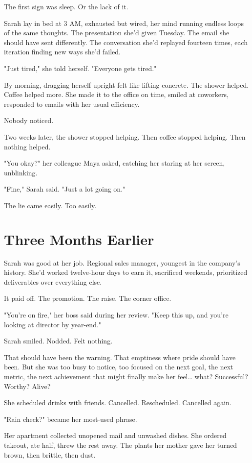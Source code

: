 \documentclass[11pt,twoside]{book}
\begin{document}
The first sign was sleep. Or the lack of it.

Sarah lay in bed at 3 AM, exhausted but wired, her mind running endless loops of the same thoughts. The presentation she'd given Tuesday. The email she should have sent differently. The conversation she'd replayed fourteen times, each iteration finding new ways she'd failed.

"Just tired," she told herself. "Everyone gets tired."

By morning, dragging herself upright felt like lifting concrete. The shower helped. Coffee helped more. She made it to the office on time, smiled at coworkers, responded to emails with her usual efficiency.

Nobody noticed.

Two weeks later, the shower stopped helping. Then coffee stopped helping. Then nothing helped.

"You okay?" her colleague Maya asked, catching her staring at her screen, unblinking.

"Fine," Sarah said. "Just a lot going on."

The lie came easily. Too easily.

\section*{Three Months Earlier}

Sarah was good at her job. Regional sales manager, youngest in the company's history. She'd worked twelve-hour days to earn it, sacrificed weekends, prioritized deliverables over everything else.

It paid off. The promotion. The raise. The corner office.

"You're on fire," her boss said during her review. "Keep this up, and you're looking at director by year-end."

Sarah smiled. Nodded. Felt nothing.

That should have been the warning. That emptiness where pride should have been. But she was too busy to notice, too focused on the next goal, the next metric, the next achievement that might finally make her feel\ldots{} what? Successful? Worthy? Alive?

She scheduled drinks with friends. Cancelled. Rescheduled. Cancelled again.

"Rain check?" became her most-used phrase.

Her apartment collected unopened mail and unwashed dishes. She ordered takeout, ate half, threw the rest away. The plants her mother gave her turned brown, then brittle, then dust.
\end{document}
